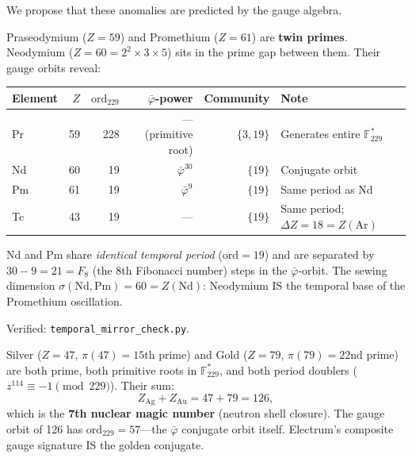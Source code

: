 We propose that these anomalies are predicted by the gauge algebra.

\begin{result}
\label{res:twin_prime_bridge}
Praseodymium ($Z = 59$) and Promethium ($Z = 61$) are \textbf{twin primes}. Neodymium ($Z = 60 = 2^2 \times 3 \times 5$) sits in the prime gap between them. Their gauge orbits reveal:
\begin{center}
\begin{tabular}{@{}lrrrrl@{}}
\toprule
\textbf{Element} & $Z$ & $\mathrm{ord}_{229}$ & $\bar\varphi$-power & \textbf{Community} & \textbf{Note} \\
\midrule
Pr & 59 & 228 & --- (primitive root) & $\{3,19\}$ & Generates entire $\mathbb{F}_{229}^*$ \\
Nd & 60 & 19 & $\bar\varphi^{30}$ & $\{19\}$ & Conjugate orbit \\
Pm & 61 & 19 & $\bar\varphi^{9}$ & $\{19\}$ & Same period as Nd \\
Tc & 43 & 19 & --- & $\{19\}$ & Same period; $\Delta Z = 18 = Z(\mathrm{Ar})$ \\
\bottomrule
\end{tabular}
\end{center}

Nd and Pm share \emph{identical temporal period} ($\mathrm{ord} = 19$) and are separated by $30 - 9 = 21 = F_8$ (the 8th Fibonacci number) steps in the $\bar\varphi$-orbit. The sewing dimension $\sigma(\mathrm{Nd}, \mathrm{Pm}) = 60 = Z(\mathrm{Nd})$: Neodymium IS the temporal base of the Promethium oscillation.

Verified: \texttt{temporal\_mirror\_check.py}.
\end{result}

\begin{result}
Silver ($Z = 47$, $\pi(47) = 15$th prime) and Gold ($Z = 79$, $\pi(79) = 22$nd prime) are both prime, both primitive roots in $\mathbb{F}_{229}^*$, and both period doublers ($z^{114} \equiv -1 \pmod{229}$). Their sum:
\[
Z_\mathrm{Ag} + Z_\mathrm{Au} = 47 + 79 = 126,
\]
which is the \textbf{7th nuclear magic number} (neutron shell closure). The gauge orbit of 126 has $\mathrm{ord}_{229} = 57$---the $\bar\varphi$ conjugate orbit itself. Electrum's composite gauge signature IS the golden conjugate.
\end{result}


